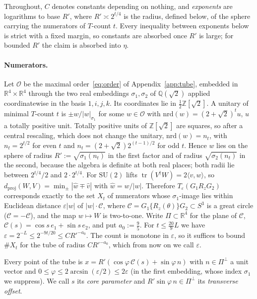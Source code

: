 \documentclass[aps,prx,twocolumn,superscriptaddress,nofootinbib,longbibliography]{revtex4-2}
\theoremstyle{plain}
\theoremstyle{definition}
\theoremstyle{remark}
\newcommand{\dproj}{d_{\mathrm{proj}}}
\newcommand{\Z}{\mathbb{Z}}
\newcommand{\Q}{\mathbb{Q}}
\newcommand{\R}{\mathbb{R}}
\newcommand{\tr}{\operatorname{tr}}
\begin{document}
Throughout, $C$ denotes constants depending on nothing, and \emph{exponents} are logarithms to base $R'$, where $R'\asymp2^{t/4}$ is the radius, defined below, of the sphere carrying the numerators of $T$-count $t$. Every inequality between exponents below is strict with a fixed margin, so constants are absorbed once $R'$ is large; for bounded $R'$ the claim is absorbed into $\eta$.

\paragraph{Numerators.} Let $\mathcal O$ be the maximal order~\eqref{eq:order} of Appendix~\ref{app:tube}, embedded in $\R^4\times\R^4$ through the two real embeddings $\sigma_1,\sigma_2$ of $\Q(\sqrt2)$ applied coordinatewise in the basis $1,i,j,k$. Its coordinates lie in $\tfrac12\Z[\sqrt2]$. A unitary of minimal $T$-count $t$ is $\pm w/|w|_{\sigma_1}$ for some $w\in\mathcal O$ with $\mathrm{nrd}(w)=(2+\sqrt2)^tu$, $u$ a totally positive unit. Totally positive units of $\Z[\sqrt2]$ are squares, so after a central rescaling, which does not change the unitary, $\mathrm{nrd}(w)=n_t$, with $n_t=2^{t/2}$ for even $t$ and $n_t=(2+\sqrt2)2^{(t-1)/2}$ for odd $t$. Hence $w$ lies on the sphere of radius $R':=\sqrt{\sigma_1(n_t)}$ in the first factor and of radius $\sqrt{\sigma_2(n_t)}$ in the second, because the algebra is definite at both real places; both radii lie between $2^{t/4}/2$ and $2\cdot2^{t/4}$. For $\mathrm{SU}(2)$ lifts $\tr(V^\dagger W)=2\langle v,w\rangle$, so $\dproj(W,V)=\min_\pm|\hat w\mp\hat v|$ with $\hat w=w/|w|$. Therefore $T_\varepsilon(G_1R_zG_2)$ corresponds exactly to the set $X_t$ of numerators whose $\sigma_1$-image lies within Euclidean distance $\varepsilon|w|$ of $|w|\cdot\mathcal C$, where $\mathcal C=G_1\{R_z(\theta)\}G_2\subset S^3$ is a great circle ($\mathcal C=-\mathcal C$), and the map $w\mapsto W$ is two-to-one. Write $\Pi\subset\R^4$ for the plane of $\mathcal C$, $\mathcal C(s)=\cos s\,e_1+\sin s\,e_2$, and put $a_0:=\tfrac95$. For $t\le\tfrac{20}9L$ we have $\varepsilon=2^{-L}\le2^{-9t/20}\le CR'^{-a_0}$. The count is monotone in $\varepsilon$, so it suffices to bound $\#X_t$ for the tube of radius $CR'^{-a_0}$, which from now on we call $\varepsilon$.

Every point of the tube is $x=R'(\cos\varphi\,\mathcal C(s)+\sin\varphi\,n)$ with $n\in\Pi^\perp$ a unit vector and $0\le\varphi\le2\arcsin(\varepsilon/2)\le2\varepsilon$ (in the first embedding, whose index $\sigma_1$ we suppress). We call $s$ its \emph{core parameter} and $R'\sin\varphi\,n\in\Pi^\perp$ its \emph{transverse offset}.
\end{document}
